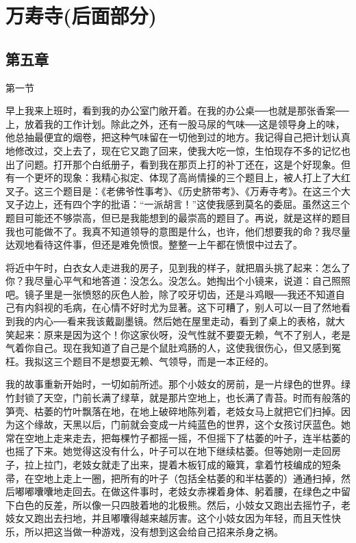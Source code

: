 \chapter{万寿寺(后面部分)}

\section{第五章}

第一节 

早上我来上班时，看到我的办公室门敞开着。在我的办公桌──也就是那张香案──上，放着我的工作计划。除此之外，还有一股马尿的气味──这是领导身上的味，他总抽最便宜的烟卷，把这种气味留在一切他到过的地方。我记得自己把计划认真地修改过，交上去了，现在它又跑了回来，使我大吃一惊，生怕现存不多的记忆也出了问题。打开那个白纸册子，看到我在那页上打的补丁还在，这是个好现象。但有一个更坏的现象：我精心拟定、体现了高尚情操的三个题目上，被人打上了大红叉子。这三个题目是：《老佛爷性事考》、《历史脐带考》、《万寿寺考》。在这三个大叉子边上，还有四个字的批语：“一派胡言！”这使我感到莫名的委屈。虽然这三个题目可能还不够崇高，但已是我能想到的最崇高的题目了。再说，就是这样的题目我也可能做不了。我真不知道领导的意图是什么，也许，他们想要我的命？我尽量达观地看待这件事，但还是难免愤恨。整整一上午都在愤恨中过去了。 

将近中午时，白衣女人走进我的房子，见到我的样子，就把眉头挑了起来：怎么了你？我尽量心平气和地答道：没怎么。没怎么。她掏出个小镜来，说道：自己照照吧。镜子里是一张愤怒的灰色人脸，除了咬牙切齿，还是斗鸡眼──我还不知道自己有内斜视的毛病，在心情不好时尤为显著。这下可糟了，别人可以一目了然地看到我的内心──看来我该戴副墨镜。然后她在屋里走动，看到了桌上的表格，就大笑起来：原来是因为这个！你这家伙呀，没气性就不要耍无赖，气不了别人，老是气着你自己。现在我知道了自己是个鼠肚鸡肠的人，这使我很伤心，但又感到冤枉。我拟这三个题目不是想耍无赖、气领导，而是一本正经的。 

我的故事重新开始时，一切如前所述。那个小妓女的房前，是一片绿色的世界。绿竹封锁了天空，门前长满了绿草，就是那片空地上，也长满了青苔。时而有般落的笋壳、枯萎的竹叶飘落在地，在地上破碎地陈列着，老妓女马上就把它们扫掉。因为这个缘故，天黑以后，门前就会变成一片纯蓝色的世界，这个女孩讨厌蓝色。她常在空地上走来走去，把每棵竹子都摇一摇，不但摇下了枯萎的叶子，连半枯萎的也摇了下来。她觉得这没有什么，叶子可以在地下继续枯萎。但等她刚一走回房子，拉上拉门，老妓女就走了出来，提着木板钉成的簸箕，拿着竹枝编成的短条帚，在空地上走上一圈，把所有的叶子（包括全枯萎的和半枯萎的）通通扫掉，然后嘟嘟囔囔地走回去。在做这件事时，老妓女赤裸着身体、躬着腰，在绿色之中留下白色的反差，所以像一只四肢着地的北极熊。然后，小妓女又跑出去摇竹子，老妓女又跑出去扫地，并且嘟囔得越来越厉害。这个小妓女因为年轻，而且天性快乐，所以把这当做一种游戏，没有想到这会给自己招来杀身之祸。 

